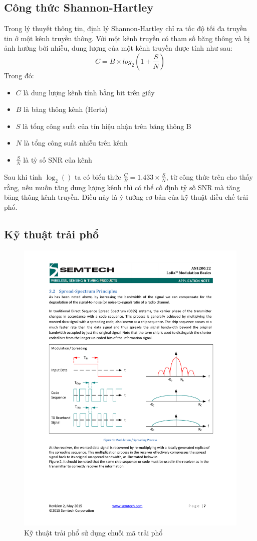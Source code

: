 	\subsection{Công thức Shannon-Hartley}
	Trong lý thuyết thông tin, định lý Shannon-Hartley chỉ ra tốc độ tối đa truyền tin ở một kênh truyền thông. Với một kênh truyền có tham số băng thông và bị ảnh hưởng bởi nhiễu, dung lượng của một kênh truyền được tính như sau:
	\begin{equation}
	C = B \times log_2(1+\frac{S}{N})
	\end{equation}
	Trong đó: 
\begin{itemize}
\item	$C$ là dung lượng kênh tính bằng bit trên giây 
\item	$B$ là băng thông kênh (Hertz)
\item	$S$ là tổng công suất của tín hiệu nhận trên băng thông B 
\item	$N$ là tổng công suất nhiễu trên kênh 
\item	$\frac{S}{N}$ là tỷ số SNR của kênh
\end{itemize} 

	Sau khi tính  $\log_2()$ ta có biểu thức $\frac{C}{B} = 1.433 \times \frac{S}{N}$, từ công thức trên cho thấy rằng, nếu muốn tăng dung lượng kênh thì có thể cố định tỷ số SNR mà tăng băng thông kênh truyền. Điều này là ý tưởng cơ bản của kỹ thuật điều chế trải phổ.
	\subsection{Kỹ thuật trải phổ}
	\begin{figure}[h!] %
			\centering
			\includegraphics[width=0.8\linewidth]{./img/21.pdf}
			\caption{Kỹ thuật trải phổ sử dụng chuỗi mã trải phổ}
			\label{fig:fig21}
	\end{figure}
	
